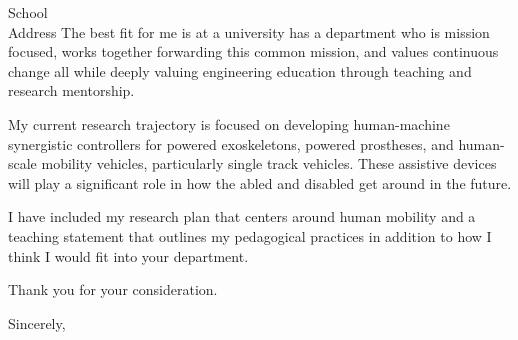 \documentclass{letter}
\begin{document}
\begin{letter}{
  School \\
  Address
}
The best fit for me is at a university has a department who is
mission focused, works together forwarding this common mission, and values
continuous change all while deeply valuing engineering education through
teaching and research mentorship.

My current research trajectory is focused on developing human-machine
synergistic controllers for powered exoskeletons, powered prostheses, and
human-scale mobility vehicles, particularly single track vehicles. These
assistive devices will play a significant role in how the abled and disabled
get around in the future.

I have included my research plan that centers around human mobility and a
teaching statement that outlines my pedagogical practices in addition to how I
think I would fit into your department.

Thank you for your consideration.

\closing{Sincerely,}

\end{letter}
\end{document}
